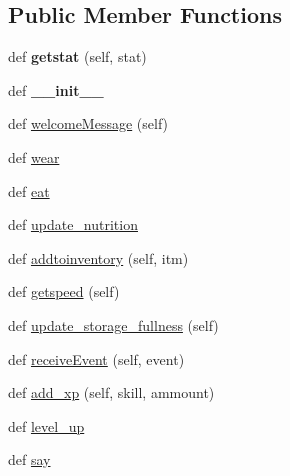 \subsection*{Public Member Functions}
\begin{DoxyCompactItemize}
\item 
\hypertarget{classplayer__input_1_1_player_object_a3ac93a16bb5a9bf271708b4af0c37f46}{}def {\bfseries getstat} (self, stat)\label{classplayer__input_1_1_player_object_a3ac93a16bb5a9bf271708b4af0c37f46}

\item 
\hypertarget{classplayer__input_1_1_player_object_a5009b71c27443800e669f120a7f613ab}{}def {\bfseries \+\_\+\+\_\+init\+\_\+\+\_\+}\label{classplayer__input_1_1_player_object_a5009b71c27443800e669f120a7f613ab}

\item 
def \hyperlink{classplayer__input_1_1_player_object_a1d0628c1c08c7140ab35437b1cdc9d6b}{welcome\+Message} (self)
\item 
def \hyperlink{classplayer__input_1_1_player_object_a6ab6a121ef8054a14532e93a4df61861}{wear}
\item 
def \hyperlink{classplayer__input_1_1_player_object_ad2ad0557d2b7c2225214f7f8f528325c}{eat}
\item 
def \hyperlink{classplayer__input_1_1_player_object_a4f44b910749a86fa11d4b33e79faadd8}{update\+\_\+nutrition}
\item 
def \hyperlink{classplayer__input_1_1_player_object_ad3e88c0f8d93bc855a79a358e1aaaa23}{addtoinventory} (self, itm)
\item 
def \hyperlink{classplayer__input_1_1_player_object_ac02046cfd454955a9e14f819aa0ad926}{getspeed} (self)
\item 
def \hyperlink{classplayer__input_1_1_player_object_a704ec767ee8a39c9af2fd8d23a9047d8}{update\+\_\+storage\+\_\+fullness} (self)
\item 
def \hyperlink{classplayer__input_1_1_player_object_aec6652d3566e917560257465fc85fb5f}{receive\+Event} (self, event)
\item 
def \hyperlink{classplayer__input_1_1_player_object_a7be8772bad156e6cab0ab2a4f965d0c0}{add\+\_\+xp} (self, skill, ammount)
\item 
def \hyperlink{classplayer__input_1_1_player_object_ae8722e8faf4f43a02a42e23ef7850a03}{level\+\_\+up}
\item 
def \hyperlink{classplayer__input_1_1_player_object_a1c52f46e66007b196d9023e711c24b98}{say}
\item 

\end{DoxyCompactItemize}
